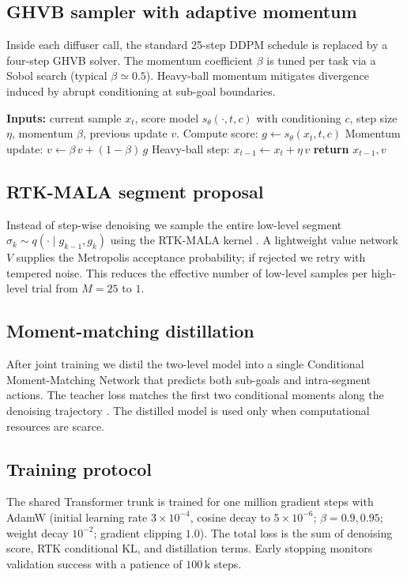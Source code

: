 \documentclass{article}
\begin{document}
\subsection{GHVB sampler with adaptive momentum}
Inside each diffuser call, the standard 25-step DDPM schedule is replaced by a four-step GHVB solver. The momentum coefficient $\beta$ is tuned per task via a Sobol search (typical $\beta \simeq 0.5$). Heavy-ball momentum mitigates divergence induced by abrupt conditioning at sub-goal boundaries.

\begin{algorithm}[H]
\caption{GHVB denoising step (single update)}
\begin{algorithmic}[1]
\State \textbf{Inputs:} current sample $x_t$, score model $s_\theta(\cdot, t, c)$ with conditioning $c$, step size $\eta$, momentum $\beta$, previous update $v$.
\State Compute score: $g \leftarrow s_\theta(x_t, t, c)$
\State Momentum update: $v \leftarrow \beta \, v + (1-\beta) \, g$
\State Heavy-ball step: $x_{t-1} \leftarrow x_t + \eta \, v$
\State \textbf{return} $x_{t-1}, v$
\end{algorithmic}
\end{algorithm}

\subsection{RTK-MALA segment proposal}
Instead of step-wise denoising we sample the entire low-level segment $\sigma_k \sim q(\cdot \mid g_{k-1}, g_k)$ using the RTK-MALA kernel \cite{huang-2024-reverse}. A lightweight value network $V$ supplies the Metropolis acceptance probability; if rejected we retry with tempered noise. This reduces the effective number of low-level samples per high-level trial from $M = 25$ to $1$.

\subsection{Moment-matching distillation}
After joint training we distil the two-level model into a single Conditional Moment-Matching Network that predicts both sub-goals and intra-segment actions. The teacher loss matches the first two conditional moments along the denoising trajectory \cite{salimans-2024-multistep}. The distilled model is used only when computational resources are scarce.

\subsection{Training protocol}
The shared Transformer trunk is trained for one million gradient steps with AdamW (initial learning rate $3 \times 10^{-4}$, cosine decay to $5 \times 10^{-6}$; $\beta = 0.9, 0.95$; weight decay $10^{-2}$; gradient clipping $1.0$). The total loss is the sum of denoising score, RTK conditional KL, and distillation terms. Early stopping monitors validation success with a patience of $100\,\mathrm{k}$ steps.
\end{document}
